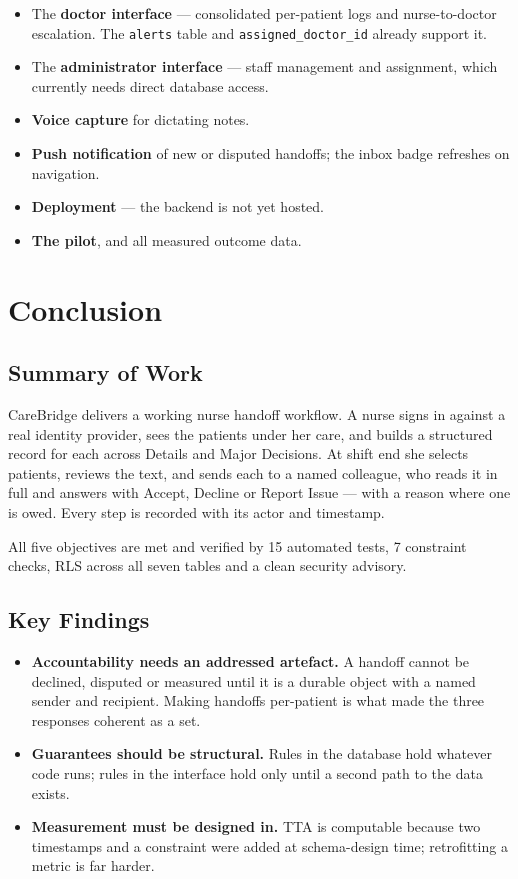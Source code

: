 \documentclass{tietreport}
\begin{document}
\begin{itemize}
  \item The \textbf{doctor interface} --- consolidated
    per-patient logs and nurse-to-doctor escalation. The
    \texttt{alerts} table and
    \texttt{assigned\_doctor\_id} already support it.
  \item The \textbf{administrator interface} --- staff
    management and assignment, which currently needs direct
    database access.
  \item \textbf{Voice capture} for dictating notes.
  \item \textbf{Push notification} of new or disputed
    handoffs; the inbox badge refreshes on navigation.
  \item \textbf{Deployment} --- the backend is not yet
    hosted.
  \item \textbf{The pilot}, and all measured outcome data.
\end{itemize}


\chapter{Conclusion}

\section{Summary of Work}

CareBridge delivers a working nurse handoff workflow. A
nurse signs in against a real identity provider, sees the
patients under her care, and builds a structured record for
each across Details and Major Decisions. At shift end she
selects patients, reviews the text, and sends each to a
named colleague, who reads it in full and answers with
Accept, Decline or Report Issue --- with a reason where one
is owed. Every step is recorded with its actor and
timestamp.

All five objectives are met and verified by 15 automated
tests, 7 constraint checks, RLS across all seven tables and
a clean security advisory.

\section{Key Findings}

\begin{itemize}
  \item \textbf{Accountability needs an addressed artefact.}
    A handoff cannot be declined, disputed or measured until
    it is a durable object with a named sender and
    recipient. Making handoffs per-patient is what made the
    three responses coherent as a set.
  \item \textbf{Guarantees should be structural.} Rules in
    the database hold whatever code runs; rules in the
    interface hold only until a second path to the data
    exists.
  \item \textbf{Measurement must be designed in.} TTA is
    computable because two timestamps and a constraint were
    added at schema-design time; retrofitting a metric is
    far harder.
\end{itemize}
\end{document}
